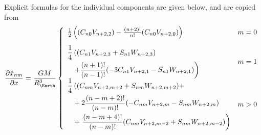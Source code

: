 Explicit formulas for the individual components are given below, and are 
copied from \cite{Montenbruck2000}
\begin{equation}
  \label{eq:mont765}
  \frac{\partial \ddot{x} _{nm}}{\partial x} 
    = \frac{GM}{R_{\Earth}^3} \left\{
    \begin{array}{ll}
      
      \frac{1}{2} \left( (C_{n0}V_{n+2,2}) - \frac{(n+2)!}{n!} (C_{n0}V_{n+2,0})
      \right) & m = 0 \\  [\bigskipamount]
      
      \begin{aligned}
        \frac{1}{4} & \left( (C_{n1}V_{n+2,3} + S_{n1} W_{n+2,3}) \right. \\
                    & \left.  + \frac{(n+1)!}{(n-1)!}(-3C_{n1}V_{n+2,1} - S_{n1}W_{n+2,1}) \right)
      \end{aligned}
      & m = 1 \\ [\bigskipamount]
      
      \begin{aligned}
        \frac{1}{4} & \left( (C_{nm}V_{n+2,m+2} + S_{nm} W_{n+2,m+2}) + \right. \\
                    &  + 2\frac{(n-m+2)!}{(n-m)!}(-C_{nm}V_{n+2,m} - S_{nm}W_{n+2,m}) \\
                    &  + \left. \frac{(n-m+4)!}{(n-m)!}(C_{nm}V_{n+2,m-2} + S_{nm}W_{n+2,m-2}) \right) 
      \end{aligned}
      & m > 0
    
    \end{array}
  \right.
\end{equation}

